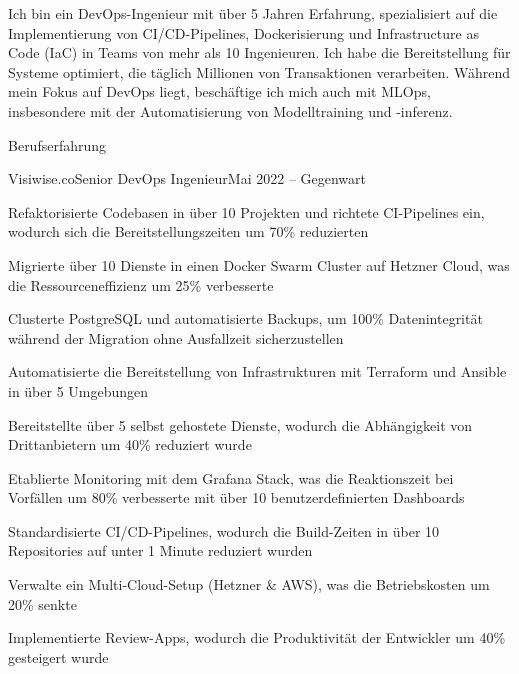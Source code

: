 \documentclass[]{main}
\begin{document}
\resumeheader
{}
{}
{}
{}
{}
{}

Ich bin ein DevOps-Ingenieur mit über 5 Jahren Erfahrung, spezialisiert auf die Implementierung von CI/CD-Pipelines, Dockerisierung und Infrastructure as Code (IaC) in Teams von mehr als 10 Ingenieuren. Ich habe die Bereitstellung für Systeme optimiert, die täglich Millionen von Transaktionen verarbeiten. Während mein Fokus auf DevOps liegt, beschäftige ich mich auch mit MLOps, insbesondere mit der Automatisierung von Modelltraining und -inferenz.

\begin{section}{Berufserfahrung}
 \begin{subsection}{Visiwise.co}{Senior DevOps Ingenieur}{Mai 2022 -- Gegenwart}{}
     \item Refaktorisierte Codebasen in über 10 Projekten und richtete CI-Pipelines ein, wodurch sich die Bereitstellungszeiten um 70\% reduzierten
     \item Migrierte über 10 Dienste in einen Docker Swarm Cluster auf Hetzner Cloud, was die Ressourceneffizienz um 25\% verbesserte
     \item Clusterte PostgreSQL und automatisierte Backups, um 100\% Datenintegrität während der Migration ohne Ausfallzeit sicherzustellen
     \item Automatisierte die Bereitstellung von Infrastrukturen mit Terraform und Ansible in über 5 Umgebungen
     \item Bereitstellte über 5 selbst gehostete Dienste, wodurch die Abhängigkeit von Drittanbietern um 40\% reduziert wurde
     \item Etablierte Monitoring mit dem Grafana Stack, was die Reaktionszeit bei Vorfällen um 80\% verbesserte mit über 10 benutzerdefinierten Dashboards
     \item Standardisierte CI/CD-Pipelines, wodurch die Build-Zeiten in über 10 Repositories auf unter 1 Minute reduziert wurden
     \item Verwalte ein Multi-Cloud-Setup (Hetzner \& AWS), was die Betriebskosten um 20\% senkte
     \item Implementierte Review-Apps, wodurch die Produktivität der Entwickler um 40\% gesteigert wurde
 \end{subsection}


\end{section}
\end{document}
